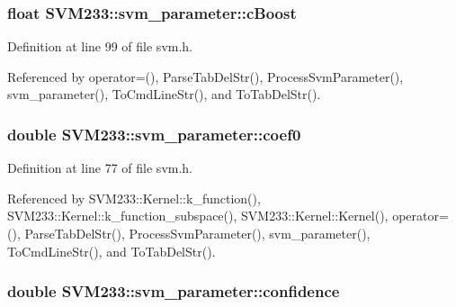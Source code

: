 \subsubsection[{\texorpdfstring{c\+Boost}{cBoost}}]{\setlength{\rightskip}{0pt plus 5cm}float S\+V\+M233\+::svm\+\_\+parameter\+::c\+Boost}\hypertarget{struct_s_v_m233_1_1svm__parameter_a6cc8bcc8a3a7194c22a892bc4a434402}{}\label{struct_s_v_m233_1_1svm__parameter_a6cc8bcc8a3a7194c22a892bc4a434402}


Definition at line 99 of file svm.\+h.



Referenced by operator=(), Parse\+Tab\+Del\+Str(), Process\+Svm\+Parameter(), svm\+\_\+parameter(), To\+Cmd\+Line\+Str(), and To\+Tab\+Del\+Str().

\subsubsection[{\texorpdfstring{coef0}{coef0}}]{\setlength{\rightskip}{0pt plus 5cm}double S\+V\+M233\+::svm\+\_\+parameter\+::coef0}\hypertarget{struct_s_v_m233_1_1svm__parameter_a50a9e4226133254cd1fd3bd57f8c6331}{}\label{struct_s_v_m233_1_1svm__parameter_a50a9e4226133254cd1fd3bd57f8c6331}


Definition at line 77 of file svm.\+h.



Referenced by S\+V\+M233\+::\+Kernel\+::k\+\_\+function(), S\+V\+M233\+::\+Kernel\+::k\+\_\+function\+\_\+subspace(), S\+V\+M233\+::\+Kernel\+::\+Kernel(), operator=(), Parse\+Tab\+Del\+Str(), Process\+Svm\+Parameter(), svm\+\_\+parameter(), To\+Cmd\+Line\+Str(), and To\+Tab\+Del\+Str().

\subsubsection[{\texorpdfstring{confidence}{confidence}}]{\setlength{\rightskip}{0pt plus 5cm}double S\+V\+M233\+::svm\+\_\+parameter\+::confidence}\hypertarget{struct_s_v_m233_1_1svm__parameter_a760c2b49fb1bf53322de2476065ea2e1}{}\label{struct_s_v_m233_1_1svm__parameter_a760c2b49fb1bf53322de2476065ea2e1}


